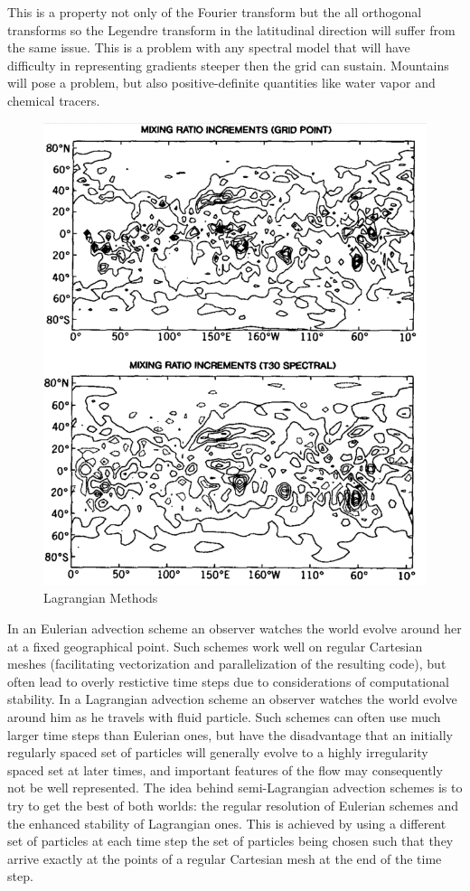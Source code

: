 This is a property not only of the
Fourier transform but the all orthogonal transforms so the Legendre
transform in the latitudinal direction will suffer from the same issue. This
is a problem with any spectral model that will have difficulty in
representing gradients steeper then the grid can sustain.
Mountains will pose a problem, but also positive-definite quantities like
water vapor and chemical tracers.

\begin{figure}[h!]
	\centering
	\includegraphics[width=0.5\linewidth]{uploads/Screenshot 2024-11-19 130213.png}
	\caption{Lagrangian Methods}
	\label{fig:lag method}
\end{figure}
In an Eulerian advection scheme an observer watches the world evolve around her at a fixed geographical point. Such schemes work well on regular Cartesian meshes (facilitating vectorization and parallelization of the resulting code), but often lead to overly restictive time steps due to considerations of computational stability. In a Lagrangian advection scheme an observer watches the world evolve around him as he travels with fluid particle. Such schemes can often use much larger time steps than Eulerian ones, but have the disadvantage that an initially regularly spaced set of particles will generally evolve to a highly irregularity spaced set at later times, and important features of the flow may consequently not be well represented. The idea behind semi-Lagrangian advection schemes is to try to get the best of both worlds: the regular resolution of Eulerian schemes and the enhanced stability of Lagrangian ones. This is achieved by using a different set of particles at each time step the set of particles being chosen such that they arrive exactly at the points of a regular Cartesian mesh at the end of the time step.

